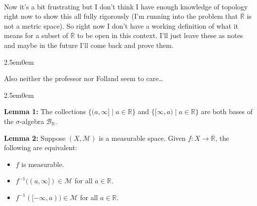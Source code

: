 \documentclass{book}
\newcommand{\hTwo}{%
\color{MidnightBlue}%
   \fontsize{13}{15}\selectfont%
}
\newcommand{\myComment}{%
   \color{RawerSienna}%
   \fontsize{12}{14}\selectfont%
}
\newenvironment{myIndent}{%
   \begin{adjustwidth}{2.5em}{0em}%
}{%
   \end{adjustwidth}%
}
\newcommand{\blab}[1]{\textbf{#1}}
\newcommand{\mySepTwo}[1][.]{%
   {\noindent\color{#1}{\rule{6.5in}{0.5mm}}}\\%
}
\newcommand{\retTwo}{\hfill\bigbreak}
\begin{document}
\mySepTwo

Now it's a bit frustrating but I don't think I have enough knowledge of topology right now to show this all fully rigorously (I'm running into the problem that $\overline{\mathbb{R}}$ is not a metric space). So right now I don't have a working definition of what it means for a subset of $\overline{\mathbb{R}}$ to be open in this context. I'll just leave these as notes and maybe in the future I'll come back and prove them.

\begin{myIndent}\myComment
   Also neither the professor nor Folland seem to care\dots
\end{myIndent}

\begin{myIndent}\hTwo 
   \blab{Lemma 1:} The collections $\{(a, \infty] \mid a \in \mathbb{R}\}$ and $\{[\infty, a) \mid a \in \mathbb{R}\}$ are both bases of the $\sigma$-algebra $\mathcal{B}_{\mathbb{R}}$.\retTwo

   \blab{Lemma 2:} Suppose $(X, \mathcal{M})$ is a measurable space. Given $f: X \longrightarrow \overline{\mathbb{R}}$, the following are equivalent:
   \begin{itemize}
      \item $f$ is measurable.
      \item $f^{-1}((a, \infty]) \in \mathcal{M}$ for all $a \in \mathbb{R}$.
      \item $f^{-1}([-\infty, a)) \in \mathcal{M}$ for all $a \in \mathbb{R}$.\retTwo
   \end{itemize}
\end{myIndent}

\mySepTwo
\end{document}
